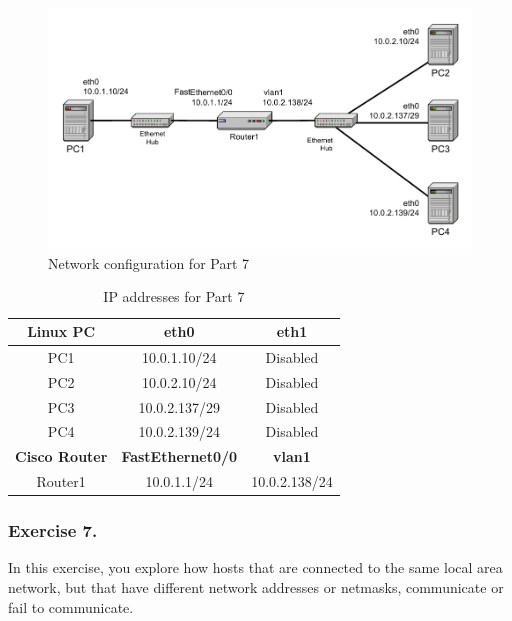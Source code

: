 \begin{figure}[h!t]
	\centering
	\includegraphics[width=\linewidth]{graphics/lab3-network4-updated.pdf}	
	\caption{Network configuration for Part 7}
	\label{fig:lab3-network4}
\end{figure}

\begin{table}[h!t]
	\centering
	\begin{tabular}{| c | c | c |}	
		\hline
		\textbf{Linux PC} & \textbf{eth0} & \textbf{eth1} \\ \hline
		PC1 & 10.0.1.10/24 & Disabled \\ 
		PC2 & 10.0.2.10/24 & Disabled \\
		PC3 & 10.0.2.137/29 & Disabled \\
		PC4 & 10.0.2.139/24 & Disabled \\ \hline
		\textbf{Cisco Router} & \textbf{FastEthernet0/0} & \textbf{vlan1} \\ \hline
		Router1 & 10.0.1.1/24 & 10.0.2.138/24 \\ \hline
	\end{tabular}
	\caption{IP addresses for Part 7}
	\label{tab:lab3-network4}
\end{table}

\subsubsection{Exercise 7.}
In this exercise, you explore how hosts that are connected to the same local area network, but that have different network addresses or netmasks, communicate or fail to communicate.


